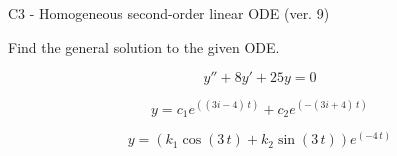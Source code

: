 \begin{exercise}
  \begin{exerciseTitle}C3 - Homogeneous second-order linear ODE (ver. 9)\end{exerciseTitle}
  \begin{exerciseStatement}
    
Find the general solution to the given ODE.

    
\[y''+8y'+25y = 0\]

  \end{exerciseStatement}
  \begin{exerciseAnswer}
    
\[y= c_{1} e^{\left(\left(3 i - 4\right) \, t\right)} + c_{2} e^{\left(-\left(3 i + 4\right) \, t\right)}\]

    
\[y= {\left(k_{1} \cos\left(3 \, t\right) + k_{2} \sin\left(3 \, t\right)\right)} e^{\left(-4 \, t\right)}\]

  \end{exerciseAnswer}
\end{exercise}